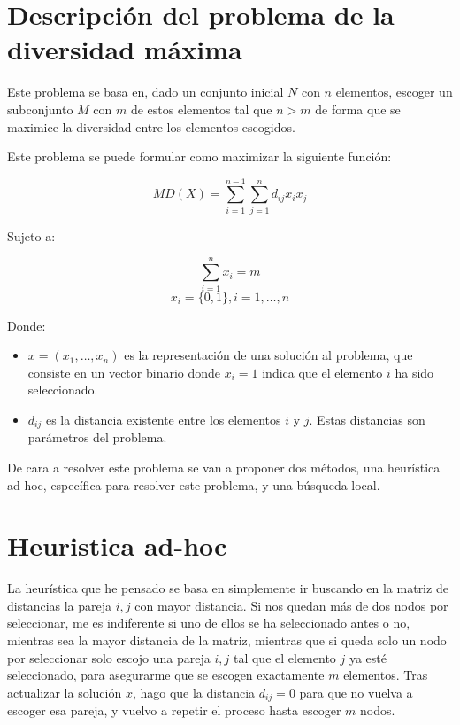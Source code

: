 \section{Descripción del problema de la diversidad máxima}

Este problema se basa en, dado un conjunto inicial $N$ con $n$ elementos, escoger un subconjunto $M$ con $m$ de estos elementos tal que $n > m$ de forma que se maximice la diversidad entre los elementos escogidos.

Este problema se puede formular como maximizar la siguiente función:

\[
MD(X) = \displaystyle\sum_{i=1}^{n - 1} \displaystyle\sum_{j=1}^{n} d_{ij} x_i x_j
\]

Sujeto a:

\[
\displaystyle\sum_{i=1}^{n} x_i = m
\]
\[
x_i = \{0,1\}, i = 1, \dots, n
\]

Donde:

\begin{itemize}
	\item $x = (x_1, \dots, x_n)$ es la representación de una solución al problema, que consiste en un vector binario donde $x_i = 1$ indica que el elemento $i$ ha sido seleccionado.
	\item $d_{ij}$ es la distancia existente entre los elementos $i$ y $j$. Estas distancias son parámetros del problema.
\end{itemize}

De cara a resolver este problema se van a proponer dos métodos, una heurística ad-hoc, específica para resolver este problema, y una búsqueda local.

\newpage


\section{Heuristica ad-hoc}

La heurística que he pensado se basa en simplemente ir buscando en la matriz de distancias la pareja $i, j$ con mayor distancia. Si nos quedan más de dos nodos por seleccionar, me es indiferente si uno de ellos se ha seleccionado antes o no, mientras sea la mayor distancia de la matriz, mientras que si queda solo un nodo por seleccionar solo escojo una pareja $i, j$ tal que el elemento $j$ ya esté seleccionado, para asegurarme que se escogen exactamente $m$ elementos. Tras actualizar la solución $x$, hago que la distancia $d_{ij} = 0$ para que no vuelva a escoger esa pareja, y vuelvo a repetir el proceso hasta escoger $m$ nodos.

